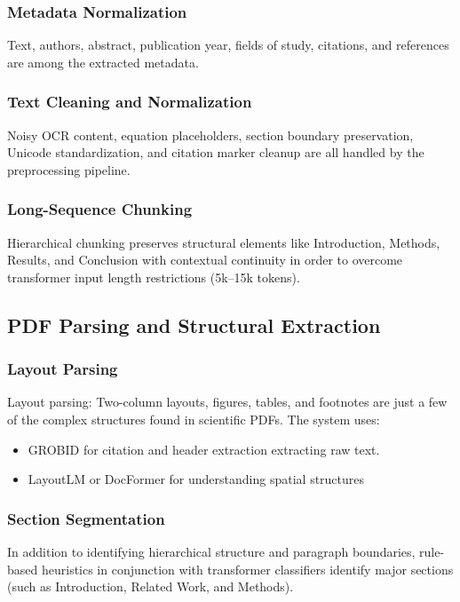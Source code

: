 \documentclass[conference]{IEEEtran}
\begin{document}
\subsubsection{Metadata Normalization}
Text, authors, abstract, publication year, fields of study, citations, and references are among the extracted metadata.

\subsubsection{Text Cleaning and Normalization}
Noisy OCR content, equation placeholders, section boundary preservation, Unicode standardization, and citation marker cleanup are all handled by the preprocessing pipeline.

\subsubsection{Long-Sequence Chunking}
Hierarchical chunking preserves structural elements like Introduction, Methods, Results, and Conclusion with contextual continuity in order to overcome transformer input length restrictions (5k–15k tokens).

\subsection{PDF Parsing and Structural Extraction}

\subsubsection{Layout Parsing}
Layout parsing: Two-column layouts, figures, tables, and footnotes are just a few of the complex structures found in scientific PDFs. The system uses:
\begin{itemize}
    \item GROBID for citation and header extraction extracting raw text.
    \item LayoutLM or DocFormer for understanding spatial structures
\end{itemize}

\subsubsection{Section Segmentation}
In addition to identifying hierarchical structure and paragraph boundaries, rule-based heuristics in conjunction with transformer classifiers identify major sections (such as Introduction, Related Work, and Methods).
\end{document}

